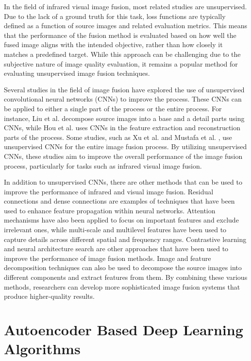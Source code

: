 In the field of infrared visual image fusion, most related studies are unsupervised. Due to the lack of a ground truth for this task, loss functions are typically defined as a function of source images and related evaluation metrics. This means that the performance of the fusion method is evaluated based on how well the fused image aligns with the intended objective, rather than how closely it matches a predefined target. While this approach can be challenging due to the subjective nature of image quality evaluation, it remains a popular method for evaluating unsupervised image fusion techniques.

Several studies in the field of image fusion have explored the use of unsupervised convolutional neural networks (CNNs) to improve the process. These CNNs can be applied to either a single part of the process or the entire process. For instance, Liu et al. \cite{liu2019infrared} decompose source images into a base and a detail parts using CNNs, while Hou et al. \cite{hou2020vif} uses CNNs in the feature extraction and reconstruction parts of the process. Some studies, such as Xu et al. \cite{xu2022cufd} and Mustafa et al. \cite{mustafa2020infrared}, use unsupervised CNNs for the entire image fusion process. By utilizing unsupervised CNNs, these studies aim to improve the overall performance of the image fusion process, particularly for tasks such as infrared visual image fusion.

In addition to unsupervised CNNs, there are other methods that can be used to improve the performance of infrared and visual image fusion. Residual connections \cite{he2016deep} and dense connections \cite{huang2017densely} are examples of techniques that have been used to enhance feature propagation within neural networks. Attention mechanisms \cite{mnih2014recurrent} have also been applied to focus on important features and exclude irrelevant ones, while multi-scale and multilevel features have been used to capture details across different spatial and frequency ranges. Contrastive learning \cite{hinton2006dimensionality} and neural architecture search \cite{zoph2017neural} are other approaches that have been used to improve the performance of image fusion methods. Image and feature decomposition techniques can also be used to decompose the source images into different components and extract features from them. By combining these various methods, researchers can develop more sophisticated image fusion systems that produce higher-quality results.

\section{Autoencoder Based Deep Learning Algorithms}
\label{sec:AE}

